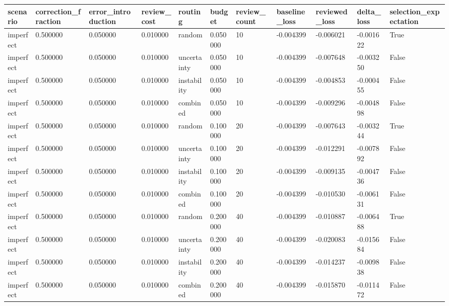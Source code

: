 \begin{tabular}{lllllllllll}
\hline
scenario & correction\_fraction & error\_introduction & review\_cost & routing & budget & review\_count & baseline\_loss & reviewed\_loss & delta\_loss & selection\_expectation \\
\hline
imperfect & 0.500000 & 0.050000 & 0.010000 & random & 0.050000 & 10 & -0.004399 & -0.006021 & -0.001622 & True \\
imperfect & 0.500000 & 0.050000 & 0.010000 & uncertainty & 0.050000 & 10 & -0.004399 & -0.007648 & -0.003250 & False \\
imperfect & 0.500000 & 0.050000 & 0.010000 & instability & 0.050000 & 10 & -0.004399 & -0.004853 & -0.000455 & False \\
imperfect & 0.500000 & 0.050000 & 0.010000 & combined & 0.050000 & 10 & -0.004399 & -0.009296 & -0.004898 & False \\
imperfect & 0.500000 & 0.050000 & 0.010000 & random & 0.100000 & 20 & -0.004399 & -0.007643 & -0.003244 & True \\
imperfect & 0.500000 & 0.050000 & 0.010000 & uncertainty & 0.100000 & 20 & -0.004399 & -0.012291 & -0.007892 & False \\
imperfect & 0.500000 & 0.050000 & 0.010000 & instability & 0.100000 & 20 & -0.004399 & -0.009135 & -0.004736 & False \\
imperfect & 0.500000 & 0.050000 & 0.010000 & combined & 0.100000 & 20 & -0.004399 & -0.010530 & -0.006131 & False \\
imperfect & 0.500000 & 0.050000 & 0.010000 & random & 0.200000 & 40 & -0.004399 & -0.010887 & -0.006488 & True \\
imperfect & 0.500000 & 0.050000 & 0.010000 & uncertainty & 0.200000 & 40 & -0.004399 & -0.020083 & -0.015684 & False \\
imperfect & 0.500000 & 0.050000 & 0.010000 & instability & 0.200000 & 40 & -0.004399 & -0.014237 & -0.009838 & False \\
imperfect & 0.500000 & 0.050000 & 0.010000 & combined & 0.200000 & 40 & -0.004399 & -0.015870 & -0.011472 & False \\
\hline
\end{tabular}
